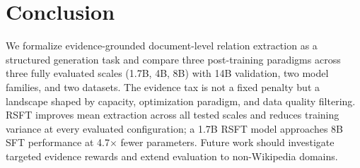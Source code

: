 \section{Conclusion}
\label{sec:conclusion}

We formalize evidence-grounded document-level relation extraction as a structured generation task and compare three post-training paradigms across three fully evaluated scales (1.7B, 4B, 8B) with 14B validation, two model families, and two datasets. The evidence tax is not a fixed penalty but a landscape shaped by capacity, optimization paradigm, and data quality filtering.
RSFT improves mean extraction across all tested scales and reduces training variance at every evaluated configuration; a 1.7B RSFT model approaches 8B SFT performance at 4.7$\times$ fewer parameters.
Future work should investigate targeted evidence rewards and extend evaluation to non-Wikipedia domains.
